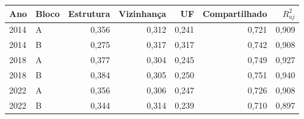 \begin{tabular}{llrrrrr}
\toprule
Ano & Bloco & Estrutura & Vizinhança & UF & Compartilhado & $R^2_{aj}$ \\
\midrule
2014 & A & 0{,}356 & 0{,}312 & 0{,}241 & 0{,}721 & 0{,}909 \\
2014 & B & 0{,}275 & 0{,}317 & 0{,}317 & 0{,}742 & 0{,}908 \\
2018 & A & 0{,}377 & 0{,}304 & 0{,}245 & 0{,}749 & 0{,}927 \\
2018 & B & 0{,}384 & 0{,}305 & 0{,}250 & 0{,}751 & 0{,}940 \\
2022 & A & 0{,}356 & 0{,}306 & 0{,}247 & 0{,}726 & 0{,}908 \\
2022 & B & 0{,}344 & 0{,}314 & 0{,}239 & 0{,}710 & 0{,}897 \\
\bottomrule
\end{tabular}
